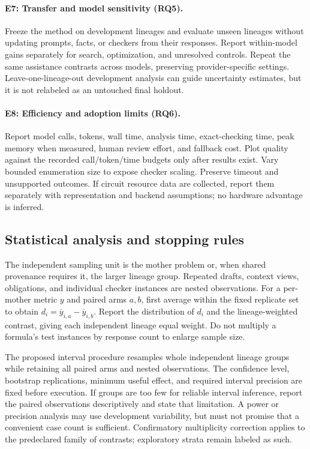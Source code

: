 \paragraph{E7: Transfer and model sensitivity (RQ5).}
Freeze the method on development lineages and evaluate unseen lineages without
updating prompts, facts, or checkers from their responses. Report within-model
gains separately for search, optimization, and unresolved controls. Repeat the
same assistance contrasts across models, preserving provider-specific settings.
Leave-one-lineage-out development analysis can guide uncertainty estimates, but
it is not relabeled as an untouched final holdout.

\paragraph{E8: Efficiency and adoption limits (RQ6).}
Report model calls, tokens, wall time, analysis time, exact-checking time, peak
memory when measured, human review effort, and fallback cost. Plot quality against
the recorded call/token/time budgets only after results exist. Vary bounded
enumeration size to expose checker scaling. Preserve timeout and unsupported
outcomes. If circuit resource data are collected, report them separately with
representation and backend assumptions; no hardware advantage is inferred.

\subsection{Statistical analysis and stopping rules}
The independent sampling unit is the mother problem or, when shared provenance
requires it, the larger lineage group. Repeated drafts, context views, obligations,
and individual checker instances are nested observations. For a per-mother metric
$y$ and paired arms $a,b$, first average within the fixed replicate set to obtain
$d_i=\overline{y}_{i,a}-\overline{y}_{i,b}$. Report the distribution of $d_i$ and
the lineage-weighted contrast, giving each independent lineage equal weight.
Do not multiply a formula's test instances by response count to enlarge sample size.

The proposed interval procedure resamples whole independent lineage groups while
retaining all paired arms and nested observations. The confidence level, bootstrap
replications, minimum useful effect, and required interval precision are fixed
before execution. If groups are too few for reliable interval inference, report
the paired observations descriptively and state that limitation. A power or
precision analysis may use development variability, but must not promise that a
convenient case count is sufficient. Confirmatory multiplicity correction applies
to the predeclared family of contrasts; exploratory strata remain labeled as such.

